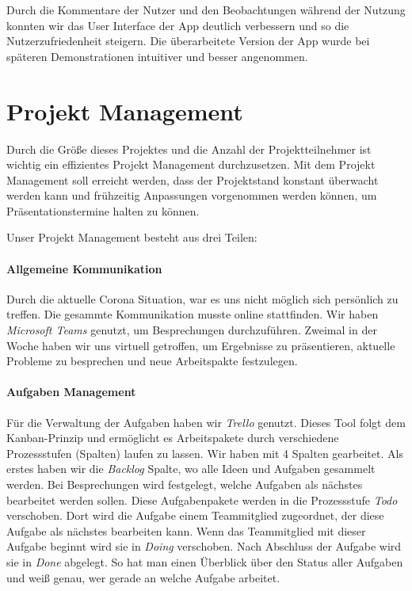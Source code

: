 \documentclass[titlepage, a4paper, 11pt]{scrartcl}
\begin{document}
        Durch die Kommentare der Nutzer und den Beobachtungen während der Nutzung konnten wir das User Interface der App deutlich verbessern und so die Nutzerzufriedenheit steigern. Die überarbeitete Version der App wurde bei späteren Demonstrationen intuitiver und besser angenommen.
      
      \section{Projekt Management}

        Durch die Größe dieses Projektes und die Anzahl der Projektteilnehmer ist wichtig ein effizientes Projekt Management durchzusetzen.
        Mit dem Projekt Management soll erreicht werden, dass der Projektstand konstant überwacht werden kann und frühzeitig Anpassungen vorgenommen werden können, um Präsentationstermine halten zu können.
        
        Unser Projekt Management besteht aus drei Teilen:
      
      \paragraph{Allgemeine Kommunikation}
        Durch die aktuelle Corona Situation, war es uns nicht möglich sich persönlich zu treffen.
        Die gesammte Kommunikation musste online stattfinden.
        Wir haben \textit{Microsoft Teams} genutzt, um Besprechungen durchzuführen.
        Zweimal in der Woche haben wir uns virtuell getroffen, um Ergebnisse zu präsentieren, aktuelle Probleme zu besprechen und neue Arbeitspakte festzulegen.
      
      \paragraph{Aufgaben Management}
        Für die Verwaltung der Aufgaben haben wir \textit{Trello} genutzt.
        Dieses Tool folgt dem Kanban-Prinzip und ermöglicht es Arbeitspakete durch verschiedene Prozessstufen (Spalten) laufen zu lassen.
        Wir haben mit 4 Spalten gearbeitet. Als erstes haben wir die \textit{Backlog} Spalte, wo alle Ideen und Aufgaben gesammelt werden.
        Bei Besprechungen wird festgelegt, welche Aufgaben als nächstes bearbeitet werden sollen. Diese Aufgabenpakete werden in die Prozessstufe \textit{Todo} verschoben.
        Dort wird die Aufgabe einem Teammitglied zugeordnet, der diese Aufgabe als nächstes bearbeiten kann.
        Wenn das Teammitglied mit dieser Aufgabe beginnt wird sie in \textit{Doing} verschoben.
        Nach Abschluss der Aufgabe wird sie in \textit{Done} abgelegt.
        So hat man einen Überblick über den Status aller Aufgaben und weiß genau, wer gerade an welche Aufgabe arbeitet.
      
\end{document}
